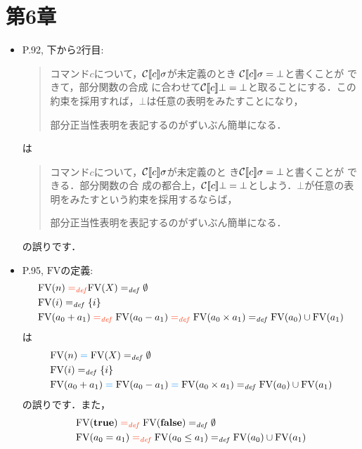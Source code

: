 \documentclass[12pt,titlepage,twoside,openright,dvipdfmx]{jsbook}
\newcommand\old[1]{%
  \textcolor[rgb]{1.0,0.25,0.1}{#1}%
  }
\newcommand\new[1]{%
  \textcolor[rgb]{0,0.55,1.0}{#1}%
  }
\theoremstyle{definition}
\begin{document}
\section*{第6章}

\ifnum{}
\ifnum{}
\begin{itemize}
\item P.92, 下から2行目:
  \begin{quote}
    コマンド$c$について，$\mathcal{C}\llbracket{c}\rrbracket\sigma$が未定義のとき
    $\mathcal{C}\llbracket{c}\rrbracket\sigma = \bot$と書くことが\old{できて，部分関数の合成
    に合わせて$\mathcal{C}\llbracket{c}\rrbracket\bot = \bot$と取ることにする．この
    約束を採用すれば，$\bot$は任意の表明をみたすことになり，}
    部分正当性表明を表記するのがずいぶん簡単になる．
  \end{quote}
  は
  \begin{quote}
    コマンド$c$について，$\mathcal{C}\llbracket{c}\rrbracket\sigma$が未定義のと
    き$\mathcal{C}\llbracket{c}\rrbracket\sigma = \bot$と書くことが\new{できる．部分関数の合
    成の都合上，$\mathcal{C}\llbracket{c}\rrbracket\bot =
    \bot$としよう．$\bot$が任意の表明をみたすという約束を採用するならば，}
    部分正当性表明を表記するのがずいぶん簡単になる．
  \end{quote}
  の誤りです．
\item P.95, $\mathrm{FV}$の定義:
  \begin{align*}
    & \FV{n} \old{{}=_{\mathit{def}{}}} \FV{X} =_{\mathit{def}} \emptyset \\
    & \FV{i} =_{\mathit{def}} \{i\} \\
    & \FV{a_0 + a_1} \old{{}=_{\mathit{def}}{}} \FV{a_0 - a_1} \old{{}=_{\mathit{def}}{}} \FV{a_0 \times a_1} =_{\mathit{def}} \FV{a_0} \cup \FV{a_1}\\
  \end{align*}
  は
  \begin{align*}
    & \FV{n} \new{{}={}} \FV{X} =_{\mathit{def}} \emptyset \\
    & \FV{i} =_{\mathit{def}} \{i\} \\
    & \FV{a_0 + a_1} \new{{}={}} \FV{a_0 - a_1} \new{{}={}} \FV{a_0 \times a_1} =_{\mathit{def}} \FV{a_0} \cup \FV{a_1}\\
  \end{align*}
  の誤りです．また，
  \begin{align*}
    & \FV{\Ttrue} \old{{}=_{\mathit{def}}{}} \FV{\Tfalse} =_{\mathit{def}} \emptyset \\
    & \FV{a_0 = a_1} \old{{}=_{\mathit{def}}{}} \FV{a_0 \leq a_1} =_{\mathit{def}} \FV{a_0} \cup \FV{a_1} \\

\end{align*}
\end{itemize}
\end{document}
